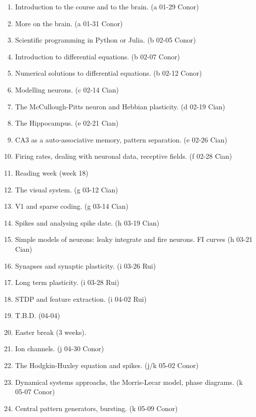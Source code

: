 \documentclass[11pt,a4paper]{scrartcl}
\begin{document}
\begin{enumerate}

\item Introduction to the course and to the brain. (a 01-29 Conor)
\item More on the brain. (a 01-31 Conor)

\item Scientific programming in Python or Julia. (b 02-05 Conor)
\item Introduction to differential equations. (b 02-07 Conor)

\item Numerical solutions to differential equations. (b 02-12 Conor)

\item Modelling neurons. (c 02-14 Cian)
\item The McCullough-Pitts neuron and Hebbian plasticity. (d 02-19 Cian)

\item The Hippocampus. (e 02-21 Cian)
\item CA3 as a auto-associative memory, pattern separation. (e 02-26 Cian)

\item Firing rates, dealing with neuronal data, receptive fields. (f 02-28 Cian)

\item Reading week (week 18)
  
\item The visual system. (g 03-12 Cian)

\item V1 and sparse coding. (g 03-14 Cian)
\item Spikes and analysing spike date. (h 03-19 Cian)

\item Simple models of neurons: leaky integrate and fire neurons. FI curves (h 03-21 Cian)
\item Synapses and synaptic plasticity. (i 03-26 Rui)
\item Long term plasticity. (i 03-28 Rui)
\item STDP and feature extraction. (i 04-02 Rui)
\item T.B.D. (04-04)

\item Easter break (3 weeks).
  
\item Ion channels. (j 04-30 Conor)
\item The Hodgkin-Huxley equation and spikes. (j/k 05-02 Conor)

\item Dynamical systems approachs, the Morris-Lecar model, phase diagrams. (k 05-07 Conor)
\item Central pattern generators, bursting. (k 05-09 Conor)

\end{enumerate}
\end{document}
